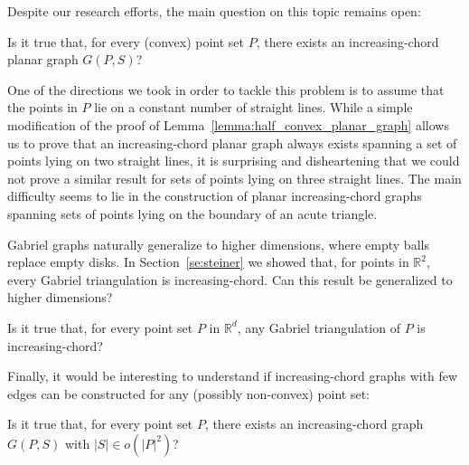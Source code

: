 \documentclass{llncs}
\begin{document}
Despite our research efforts, the main question on this topic remains open:

\begin{problem}
Is it true that, for every (convex) point set $P$, there exists an increasing-chord planar graph $G(P,S)$?
\end{problem}

One of the directions we took in order to tackle this problem is to assume that the points in $P$ lie on a constant number of straight lines. While a simple modification of the proof of Lemma~\ref{lemma:half_convex_planar_graph} allows us to prove that an increasing-chord planar graph always exists spanning a set of points lying on two straight lines, it is surprising and disheartening that we could not prove a similar result for sets of points lying on three straight lines. The main difficulty seems to lie in the construction of planar increasing-chord graphs spanning sets of points lying on the boundary of an acute triangle.

Gabriel graphs naturally generalize to higher dimensions, where empty balls replace empty disks. In Section~\ref{se:steiner} we showed that, for points in $\mathbb R^2$, every Gabriel triangulation is increasing-chord. Can this result be generalized to higher dimensions?

\begin{problem}
Is it true that, for every point set $P$ in $\mathbb R^d$, any Gabriel triangulation of $P$ is increasing-chord?\end{problem}

Finally, it would be interesting to understand if increasing-chord graphs with few edges can be constructed for any (possibly non-convex) point set:

\begin{problem}
Is it true that, for every point set $P$, there exists an increasing-chord graph $G(P,S)$ with $|S|\in o(|P|^2)$?
\end{problem}



\end{document}
